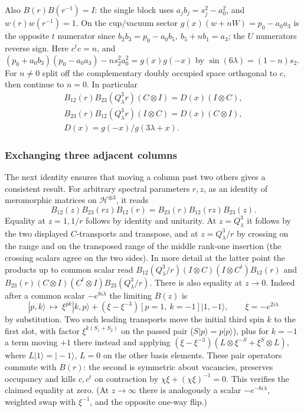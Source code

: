 Also \(B(r)B(r^{-1})=I\): the single block uses \(a_j b_j=s_j^2-a_0^2\), and \(w(r)w(r^{-1})=1\). On the cup/vacuum sector \(g(x)(w+nW)=p_0-a_0 a_3\) is the opposite \(t\) numerator since \(b_2b_3=p_0-a_0 b_5,\ b_5+n b_1=a_3\); the \(U\) numerators reverse sign. Here \(c^tc=n\), and
\((p_0+a_0b_3)(p_0-a_0a_3)-n s_2^2a_0^2=g(x)g(-x)\) by \(\sin(6\lambda)=(1-n)s_2\). For \(n\ne0\) split off the complementary doubly occupied space orthogonal to \(c\), then continue to \(n=0\). In particular
\[
\begin{gathered}
 B_{12}(r)B_{23}(Q_\lambda^3 r)(C\otimes I)=D(x)(I\otimes C),\\
 B_{23}(r)B_{12}(Q_\lambda^3 r)(I\otimes C)=D(x)(C\otimes I),\\
 D(x)=g(-x)/g(3\lambda+x).
\end{gathered}
\]

\subsubsection{Exchanging three adjacent columns}

The next identity ensures that moving a column past two others gives a
consistent result. For arbitrary spectral parameters $r,z$, as an identity
of meromorphic matrices on $\mathcal H^{\otimes3}$, it reads
\[
 B_{12}(z) B_{23}(rz) B_{12}(r)= B_{23}(r)B_{12}(rz)B_{23}(z).
\]
Equality at \(z=1,1/r\) follows by identity and unitarity. At \(z=Q_\lambda^3\) it follows by the two displayed \(C\)-transports and transpose, and at \(z=Q_\lambda^3/r\) by crossing on the range and on the transposed range of the middle rank-one insertion (the crossing scalars agree on the two sides). In more detail at the latter point the products up to common scalar read
\(B_{12}(Q_\lambda^3/r)(I\otimes C)(I\otimes C^t)B_{12}(r)\) and
\(B_{23}(r)(C\otimes I)(C^t\otimes I)B_{23}(Q_\lambda^3/r)\).
There is also equality at \(z\to0\). Indeed after a common scalar \(-e^{8i\lambda}\) the limiting \(B(z)\) is
\[
 |p,k\rangle\ \mapsto\ \xi^{pk}|k,p\rangle+(\xi-\xi^{-3})[p=1,\ k=-1]|1,-1\rangle,\qquad \xi=-e^{2i\lambda}
\]
by substitution. Two such leading transports move the initial third spin \(k\) to the first slot, with factor \(\xi^{k(S_1+S_2)}\) on the passed pair (\(S|p\rangle=p|p\rangle\)), plus for \(k=-1\) a term moving \(+1\) there instead and applying \((\xi-\xi^{-3})(L\otimes \xi^{-S}+\xi^S\otimes L)\), where \(L|1\rangle=|-1\rangle\), \(L=0\) on the other basis elements. These pair operators commute with \(B(r)\): the second is symmetric about vacancies, preserves occupancy and kills \(c,c^t\) on contraction by \(\chi\xi+(\chi\xi)^{-1}=0\). This verifies the claimed equality at zero. (At \(z\to\infty\) there is analogously a scalar \(-e^{-8i\lambda}\), weighted swap with \(\xi^{-1}\), and the opposite one-way flip.)

